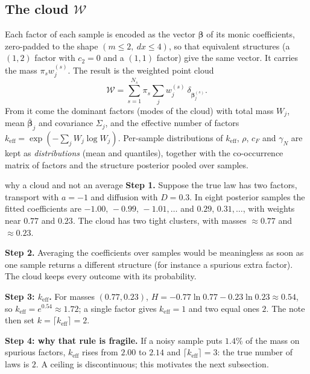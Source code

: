 \documentclass[11pt,a4paper]{article}
\theoremstyle{definition}
\newcommand{\bs}{\boldsymbol}
\begin{document}
\subsection{The cloud $\mathcal W$}
Each factor of each sample is encoded as the vector $\bs\beta$ of its monic coefficients, zero-padded to the shape $(m\le2,\ dx\le4)$, so that equivalent structures (a $(1,2)$ factor with $c_2=0$ and a $(1,1)$ factor) give the same vector. It carries the mass $\pi_sw^{(s)}_j$. The result is the weighted point cloud
\begin{equation}\label{eq:cloud}
\mathcal W=\sum_{s=1}^{N_s}\pi_s\sum_jw^{(s)}_j\ \delta_{\bs\beta^{(s)}_j}.
\end{equation}
From it come the dominant factors (modes of the cloud) with total mass $W_j$, mean $\bar{\bs\beta}_j$ and covariance $\Sigma_j$, and the effective number of factors $k_{\mathrm{eff}}=\exp(-\sum_jW_j\log W_j)$. Per-sample distributions of $k_{\mathrm{eff}}$, $\rho$, $c_F$ and $\gamma_N$ are kept as \emph{distributions} (mean and quantiles), together with the co-occurrence matrix of factors and the structure posterior pooled over samples.

\begin{explained}{why a cloud and not an average}
\textbf{Step 1.} Suppose the true law has two factors, transport with $a=-1$ and diffusion with $D=0.3$. In eight posterior samples the fitted coefficients are $-1.00,\,-0.99,\,-1.01,\dots$ and $0.29,\,0.31,\dots$, with weights near $0.77$ and $0.23$. The cloud has two tight clusters, with masses $\approx0.77$ and $\approx0.23$.

\medskip\textbf{Step 2.} Averaging the coefficients over samples would be meaningless as soon as one sample returns a different structure (for instance a spurious extra factor). The cloud keeps every outcome with its probability.

\medskip\textbf{Step 3: $k_{\mathrm{eff}}$.} For masses $(0.77,0.23)$, $H=-0.77\ln0.77-0.23\ln0.23\approx0.54$, so $k_{\mathrm{eff}}=e^{0.54}\approx1.72$; a single factor gives $k_{\mathrm{eff}}=1$ and two equal ones $2$. The note then set $k=\lceil k_{\mathrm{eff}}\rceil=2$.

\medskip\textbf{Step 4: why that rule is fragile.} If a noisy sample puts $1.4\%$ of the mass on spurious factors, $k_{\mathrm{eff}}$ rises from $2.00$ to $2.14$ and $\lceil k_{\mathrm{eff}}\rceil=3$: the true number of laws is $2$. A ceiling is discontinuous; this motivates the next subsection.
\end{explained}
\end{document}
